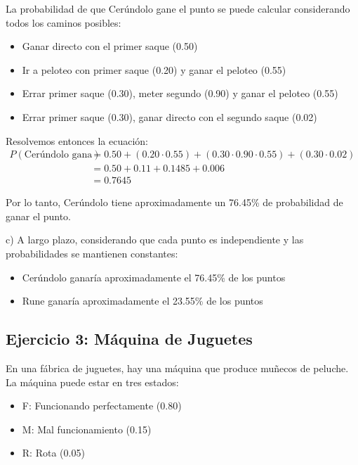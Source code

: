 \documentclass[a4paper,11pt]{article}
\begin{document}
La probabilidad de que Cerúndolo gane el punto se puede calcular considerando todos los caminos posibles:
\begin{itemize}
    \item Ganar directo con el primer saque (0.50)
    \item Ir a peloteo con primer saque (0.20) y ganar el peloteo (0.55)
    \item Errar primer saque (0.30), meter segundo (0.90) y ganar el peloteo (0.55)
    \item Errar primer saque (0.30), ganar directo con el segundo saque (0.02)
\end{itemize}

Resolvemos entonces la ecuación:
\[
\begin{split}
P(\text{Cerúndolo gana}) &= 0.50 + (0.20 \cdot 0.55) + (0.30 \cdot 0.90 \cdot 0.55) + (0.30 \cdot 0.02) \\
&= 0.50 + 0.11 + 0.1485 + 0.006 \\
&= 0.7645
\end{split}
\]

Por lo tanto, Cerúndolo tiene aproximadamente un 76.45\% de probabilidad de ganar el punto.

\vspace{0.5em}

c) A largo plazo, considerando que cada punto es independiente y las probabilidades se mantienen constantes:
\begin{itemize}
    \item Cerúndolo ganaría aproximadamente el 76.45\% de los puntos
    \item Rune ganaría aproximadamente el 23.55\% de los puntos
\end{itemize}

\subsection{Ejercicio 3: Máquina de Juguetes}

En una fábrica de juguetes, hay una máquina que produce muñecos de peluche. La máquina puede estar en tres estados:

\begin{itemize}
    \item F: Funcionando perfectamente (0.80)
    \item M: Mal funcionamiento (0.15)
    \item R: Rota (0.05)
\end{itemize}
\end{document}
